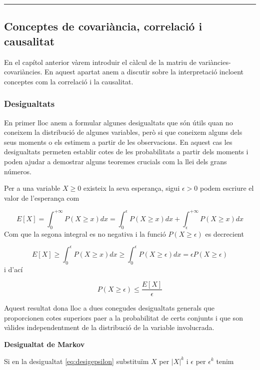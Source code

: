 \documentclass[
  catalan,
]{article}
\theoremstyle{definition}
\theoremstyle{definition}
\theoremstyle{definition}
\theoremstyle{definition}
\theoremstyle{remark}
\begin{document}
\begin{center}\rule{0.5\linewidth}{0.5pt}\end{center}

\subsection{Conceptes de covariància, correlació i causalitat}\label{conceptes-de-covariuxe0ncia-correlaciuxf3-i-causalitat}

En el capítol anterior vàrem introduir el càlcul de la matriu de variàncies-covariàncies. En aquest apartat anem a discutir sobre la interpretació incloent conceptes com la correlació i la causalitat.

\subsubsection{Desigualtats}\label{desigualtats}

En primer lloc anem a formular algunes desigualtats que són útils quan no coneixem la distribució de algunes variables, però si que coneixem alguns dels seus moments o els estimem a partir de les observacions. En aquest cas les desigualtats permeten establir cotes de les probabilitats a partir dels moments i poden ajudar a demostrar alguns teoremes crucials com la llei dels grans números.

Per a una variable \(X \geq 0\) existeix la seva esperança, sigui \(\epsilon>0\) podem escriure el valor de l'esperança com

\[
E[X]=\int_0^{+\infty} P(X \geq x)dx=\int_0^{\epsilon} P(X \geq x)dx+\int_{\epsilon}^{+\infty} P(X \geq x)dx 
\]
Com que la segona integral es no negativa i la funció \(P(X \geq \epsilon)\) es decrecient

\[
E[X] \geq \int_0^{\epsilon} P(X \geq x)dx\geq \int_0^{\epsilon} P(X \geq \epsilon)dx= \epsilon P(X \geq \epsilon)
\]
i d'ací

\[
 P(X \geq \epsilon) \leq \dfrac{E[X]}{\epsilon} \label{eq:desigepsilon}
 \]

Aquest resultat dona lloc a dues conegudes desigualtats generals que proporcionen cotes superiors paer a la probabilitat de certs conjunts i que son vàlides independentment de la distribució de la variable involucrada.

\textbf{Desigualtat de Markov}

Si en la desigualtat \eqref{eq:desigepsilon} substituïm \(X\) per \(|X|^k\) i \(\epsilon\) per \(\epsilon^k\) tenim
\end{document}

